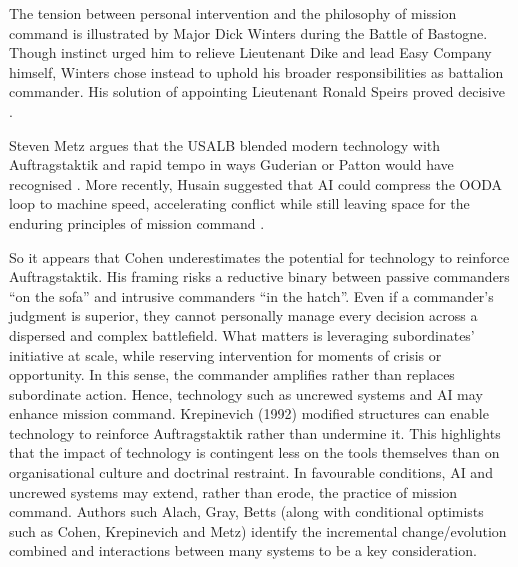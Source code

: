 The tension between personal intervention and the philosophy of mission command is illustrated by Major Dick Winters during the Battle of Bastogne. Though instinct urged him to relieve Lieutenant Dike and lead Easy Company himself, Winters chose instead to uphold his broader responsibilities as battalion commander. His solution of appointing Lieutenant Ronald Speirs proved decisive \parencite[p.~186]{WINTERS_2006}.  

Steven Metz argues that the USALB blended modern technology with Auftragstaktik and rapid tempo in ways Guderian or Patton would have recognised \parencite{METZ_2000}. More recently, Husain suggested that AI could compress the OODA loop to machine speed, accelerating conflict while still leaving space for the enduring principles of mission command \parencite{HUSAIN_2021}.


So it appears that Cohen underestimates the potential for technology to reinforce Auftragstaktik. His framing risks a reductive binary between passive commanders ``on the sofa” and intrusive commanders ``in the hatch”. Even if a commander’s judgment is superior, they cannot personally manage every decision across a dispersed and complex battlefield. What matters is leveraging subordinates’ initiative at scale, while reserving intervention for moments of crisis or opportunity. In this sense, the commander amplifies rather than replaces subordinate action. Hence, technology such as uncrewed systems and AI may enhance mission command. Krepinevich (1992) modified structures can enable technology to reinforce Auftragstaktik rather than undermine it\nocite{KREPINEVICH_1992}. This highlights that the impact of technology is contingent less on the tools themselves than on organisational culture and doctrinal restraint. In favourable conditions, AI and uncrewed systems may extend, rather than erode, the practice of mission command. %
 Authors such Alach, Gray, Betts (along with conditional optimists such as Cohen, Krepinevich and Metz) identify the incremental change/evolution combined and interactions between many systems to be a key consideration.



